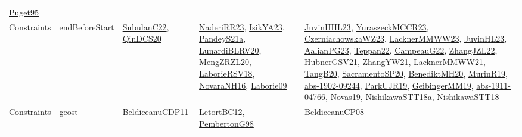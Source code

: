 {\begin{longtable}{lp{3cm}>{\raggedright}p{6cm}>{\raggedright}p{6cm}p{8cm}}
\href{papers/Puget95.pdf}{Puget95}\cite{Puget95}\\
Constraints & endBeforeStart & \href{articles/SubulanC22.pdf}{SubulanC22}\cite{SubulanC22}, \href{articles/QinDCS20.pdf}{QinDCS20}\cite{QinDCS20} & \href{articles/NaderiRR23.pdf}{NaderiRR23}\cite{NaderiRR23}, \href{articles/IsikYA23.pdf}{IsikYA23}\cite{IsikYA23}, \href{articles/PandeyS21a.pdf}{PandeyS21a}\cite{PandeyS21a}, \href{articles/LunardiBLRV20.pdf}{LunardiBLRV20}\cite{LunardiBLRV20}, \href{articles/MengZRZL20.pdf}{MengZRZL20}\cite{MengZRZL20}, \href{articles/LaborieRSV18.pdf}{LaborieRSV18}\cite{LaborieRSV18}, \href{articles/NovaraNH16.pdf}{NovaraNH16}\cite{NovaraNH16}, \href{papers/Laborie09.pdf}{Laborie09}\cite{Laborie09} & \href{papers/JuvinHHL23.pdf}{JuvinHHL23}\cite{JuvinHHL23}, \href{articles/YuraszeckMCCR23.pdf}{YuraszeckMCCR23}\cite{YuraszeckMCCR23}, \href{articles/CzerniachowskaWZ23.pdf}{CzerniachowskaWZ23}\cite{CzerniachowskaWZ23}, \href{articles/LacknerMMWW23.pdf}{LacknerMMWW23}\cite{LacknerMMWW23}, \href{papers/JuvinHL23.pdf}{JuvinHL23}\cite{JuvinHL23}, \href{papers/AalianPG23.pdf}{AalianPG23}\cite{AalianPG23}, \href{papers/Teppan22.pdf}{Teppan22}\cite{Teppan22}, \href{articles/CampeauG22.pdf}{CampeauG22}\cite{CampeauG22}, \href{papers/ZhangJZL22.pdf}{ZhangJZL22}\cite{ZhangJZL22}, \href{articles/HubnerGSV21.pdf}{HubnerGSV21}\cite{HubnerGSV21}, \href{articles/ZhangYW21.pdf}{ZhangYW21}\cite{ZhangYW21}, \href{papers/LacknerMMWW21.pdf}{LacknerMMWW21}\cite{LacknerMMWW21}, \href{papers/TangB20.pdf}{TangB20}\cite{TangB20}, \href{articles/SacramentoSP20.pdf}{SacramentoSP20}\cite{SacramentoSP20}, \href{articles/BenediktMH20.pdf}{BenediktMH20}\cite{BenediktMH20}, \href{papers/MurinR19.pdf}{MurinR19}\cite{MurinR19}, \href{articles/abs-1902-09244.pdf}{abs-1902-09244}\cite{abs-1902-09244}, \href{papers/ParkUJR19.pdf}{ParkUJR19}\cite{ParkUJR19}, \href{papers/GeibingerMM19.pdf}{GeibingerMM19}\cite{GeibingerMM19}, \href{articles/abs-1911-04766.pdf}{abs-1911-04766}\cite{abs-1911-04766}, \href{articles/Novas19.pdf}{Novas19}\cite{Novas19}, \href{papers/NishikawaSTT18a.pdf}{NishikawaSTT18a}\cite{NishikawaSTT18a}, \href{papers/NishikawaSTT18.pdf}{NishikawaSTT18}\cite{NishikawaSTT18}\\
Constraints & geost & \href{articles/BeldiceanuCDP11.pdf}{BeldiceanuCDP11}\cite{BeldiceanuCDP11} & \href{papers/LetortBC12.pdf}{LetortBC12}\cite{LetortBC12}, \href{papers/PembertonG98.pdf}{PembertonG98}\cite{PembertonG98} & \href{papers/BeldiceanuCP08.pdf}{BeldiceanuCP08}\cite{BeldiceanuCP08}\\

\end{longtable}}
